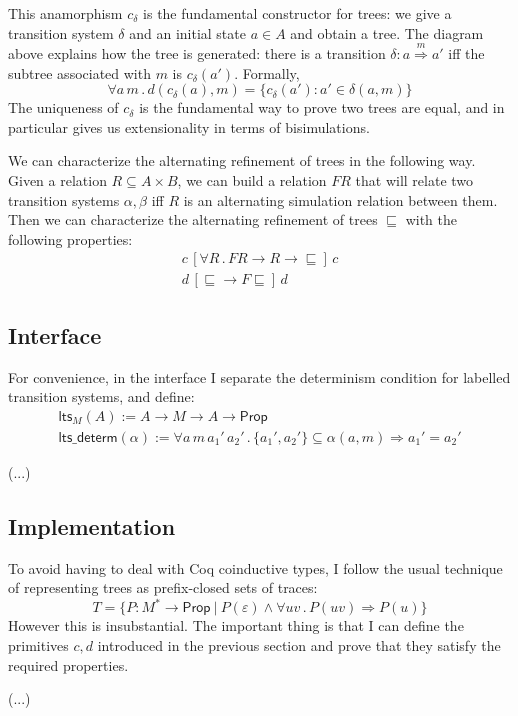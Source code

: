 \documentclass[11pt]{article}
\newcommand{\kw}[1]{{\mathsf{#1}}}
\begin{document}
This anamorphism $c_\delta$ is
the fundamental constructor for trees:
we give a transition system $\delta$ and an initial state $a \in A$
and obtain a tree.
The diagram above explains how the tree is generated:
there is a transition $\delta : a \stackrel{m}{\Longrightarrow} a'$ iff
the subtree associated with $m$ is $c_{\delta}(a')$.
Formally,
\[
  \forall a \, m \,.\,
    d(c_{\delta}(a), m) = \{ c_{\delta}(a') : a' \in \delta(a, m) \}
\]
The uniqueness of $c_\delta$ is
the fundamental way to prove two trees are equal,
and in particular gives us extensionality
in terms of bisimulations.

We can characterize the alternating refinement of trees
in the following way.
Given a relation $R \subseteq A \times B$,
we can build a relation $F R$ that will relate
two transition systems $\alpha, \beta$ iff
$R$ is an alternating simulation relation between them.
Then we can characterize the alternating refinement of trees $\sqsubseteq$
with the following properties:
\begin{gather*}
  c \, [\forall R \, . \, F R \rightarrow R \rightarrow {\sqsubseteq}] \, c \\
  d \, [{\sqsubseteq} \rightarrow F {\sqsubseteq}] \, d
\end{gather*}

\subsection{Interface}

For convenience,
in the interface I separate the determinism condition
for labelled transition systems, and define:
\begin{gather*}
  \kw{lts}_M(A) :=
    A \rightarrow M \rightarrow A \rightarrow \kw{Prop} \\
  \kw{lts\_determ}(\alpha) :=
    \forall a \, m \, a_1' \, a_2' \,.\,
      \{ a_1', a_2' \} \subseteq \alpha(a, m) \Rightarrow
      a_1' = a_2'
\end{gather*}

(...)

\subsection{Implementation}

To avoid having to deal with Coq coinductive types,
I follow the usual technique of representing trees as
prefix-closed sets of traces:
\[
  T = \{ P : M^* \rightarrow \kw{Prop} \ \vert\ 
    P(\varepsilon) \wedge
    \forall u v \,.\, P(u v) \Rightarrow P(u) \}
\]
However this is insubstantial.
The important thing is that I can define the primitives $c, d$
introduced in the previous section and prove that they
satisfy the required properties.

(...)
\end{document}
